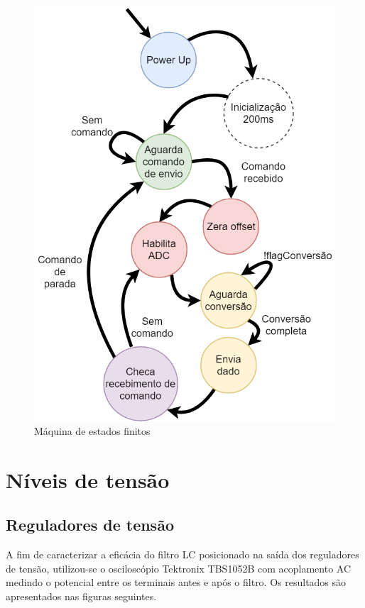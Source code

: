 \documentclass[
	12pt,				%
	openright,			%
	twoside,			%
	a4paper,			%
	english,			%
	french,				%
	spanish,			%
	brazil,				%
	]{abntex2}
\begin{document}
	\begin{figure}[!ht]
		\centering
		\includegraphics[scale = .47]{../Fotos/diagramaTelemetria.png}
		\caption{Máquina de estados finitos}
		\label{fig:FSM}
	\end{figure}

	\section{Níveis de tensão}
		\subsection{Reguladores de tensão}
			A fim de caracterizar a eficácia do filtro LC
			posicionado na saída dos reguladores de tensão, utilizou-se o
			osciloscópio Tektronix TBS1052B com acoplamento AC medindo o
			potencial entre os terminais antes e após o filtro. Os
			resultados são apresentados nas figuras seguintes.
\end{document}
